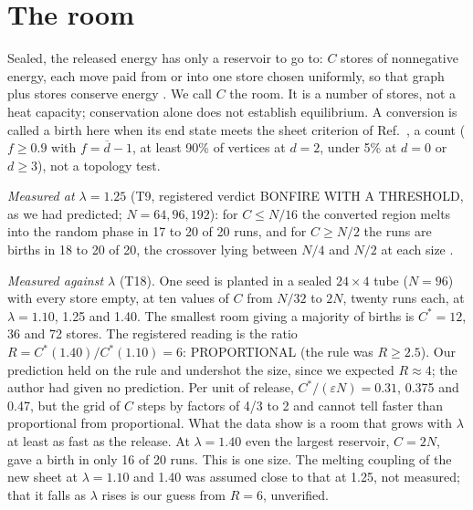 \documentclass[aps,pre,10pt,twocolumn,superscriptaddress,nofootinbib]{revtex4-2}
\begin{document}
\section{The room}
\label{sec:room}

Sealed, the released energy has only a reservoir to go to: $C$ stores of nonnegative energy, each move paid from
or into one store chosen uniformly, so that graph plus stores conserve energy \cite{paper1}. We call $C$ the
room. It is a number of stores, not a heat capacity; conservation alone does not establish equilibrium. A conversion is called a birth here when its end state meets the sheet criterion of
Ref.~\cite{paper1}, a count ($f\ge0.9$ with $f=\overline d-1$, at least 90\% of vertices at $d=2$, under 5\% at
$d=0$ or $d\ge3$), not a topology test.

\emph{Measured at $\lambda=1.25$} (T9, registered verdict BONFIRE WITH A THRESHOLD, as we had predicted;
$N=64,96,192$): for
$C\le N/16$ the converted region melts into the random phase in 17 to 20 of 20 runs, and for $C\ge N/2$ the runs
are births in 18 to 20 of 20, the crossover lying between $N/4$ and $N/2$ at each size \cite{paper1}.

\emph{Measured against $\lambda$} (T18). One seed is planted in a sealed $24\times4$ tube ($N=96$) with every
store empty, at ten values of $C$ from $N/32$ to $2N$, twenty runs each, at $\lambda=1.10$, 1.25 and 1.40. The
smallest room giving a majority of births is $C^*=12$, 36 and 72 stores. The registered reading is the ratio
$R=C^*(1.40)/C^*(1.10)=6$: PROPORTIONAL (the rule was $R\ge2.5$). Our prediction held on the rule and undershot
the size, since we expected $R\approx4$; the author had given no prediction. Per unit of release,
$C^*/(\varepsilon N)=0.31$, 0.375 and 0.47, but the grid of $C$ steps by factors of 4/3 to 2 and cannot tell
faster than proportional from proportional. What the data show is a room that grows with $\lambda$ at least as
fast as the release. At $\lambda=1.40$ even the largest reservoir, $C=2N$, gave a birth in only 16 of 20 runs.
This is one size. The melting coupling of the new sheet at $\lambda=1.10$ and 1.40 was assumed close to that at
1.25, not measured; that it falls as $\lambda$ rises is our guess from $R=6$, unverified.
\end{document}
